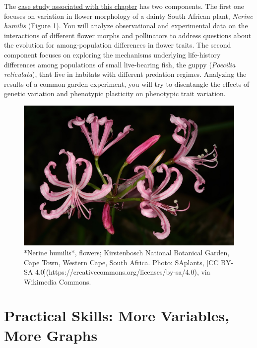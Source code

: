 \documentclass[
]{book}
\begin{document}
The \href{exercises/BIOL520-ex8.zip}{case study associated with this chapter} has two components. The first one focuses on variation in flower morphology of a dainty South African plant, \emph{Nerine humilis} (Figure \ref{fig:nerine}). You will analyze observational and experimental data on the interactions of different flower morphs and pollinators to address questions about the evolution for among-population differences in flower traits. The second component focuses on exploring the mechanisms underlying life-history differences among populations of small live-bearing fish, the guppy (\emph{Poecilia reticulata}), that live in habitats with different predation regimes. Analyzing the results of a common garden experiment, you will try to disentangle the effects of genetic variation and phenotypic plasticity on phenotypic trait variation.

\begin{figure}
\includegraphics[width=1\linewidth]{images/Nerine} \caption{*Nerine humilis*, flowers; Kirstenbosch National Botanical Garden, Cape Town, Western Cape, South Africa. Photo: SAplants, [CC BY-SA 4.0](https://creativecommons.org/licenses/by-sa/4.0), via Wikimedia Commons.}\label{fig:nerine}
\end{figure}

\hypertarget{practical-skills-more-variables-more-graphs}{%
\section{Practical Skills: More Variables, More Graphs}\label{practical-skills-more-variables-more-graphs}}
\end{document}
